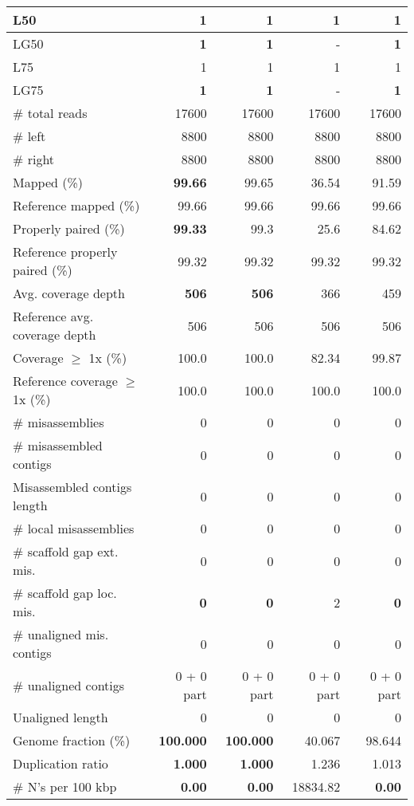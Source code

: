 \documentclass[12pt,a4paper]{article}
\begin{document}
\begin{table}[ht]
\begin{center}
\begin{tabular}{|l*{4}{|r}|}
L50 & 1 & 1 & 1 & 1 \\ \hline
LG50 & {\bf 1} & {\bf 1} & - & {\bf 1} \\ \hline
L75 & 1 & 1 & 1 & 1 \\ \hline
LG75 & {\bf 1} & {\bf 1} & - & {\bf 1} \\ \hline
\# total reads & 17600 & 17600 & 17600 & 17600 \\ \hline
\# left & 8800 & 8800 & 8800 & 8800 \\ \hline
\# right & 8800 & 8800 & 8800 & 8800 \\ \hline
Mapped (\%) & {\bf 99.66} & 99.65 & 36.54 & 91.59 \\ \hline
Reference mapped (\%) & 99.66 & 99.66 & 99.66 & 99.66 \\ \hline
Properly paired (\%) & {\bf 99.33} & 99.3 & 25.6 & 84.62 \\ \hline
Reference properly paired (\%) & 99.32 & 99.32 & 99.32 & 99.32 \\ \hline
Avg. coverage depth & {\bf 506} & {\bf 506} & 366 & 459 \\ \hline
Reference avg. coverage depth & 506 & 506 & 506 & 506 \\ \hline
Coverage $\geq$ 1x (\%) & 100.0 & 100.0 & 82.34 & 99.87 \\ \hline
Reference coverage $\geq$ 1x (\%) & 100.0 & 100.0 & 100.0 & 100.0 \\ \hline
\# misassemblies & 0 & 0 & 0 & 0 \\ \hline
\# misassembled contigs & 0 & 0 & 0 & 0 \\ \hline
Misassembled contigs length & 0 & 0 & 0 & 0 \\ \hline
\# local misassemblies & 0 & 0 & 0 & 0 \\ \hline
\# scaffold gap ext. mis. & 0 & 0 & 0 & 0 \\ \hline
\# scaffold gap loc. mis. & {\bf 0} & {\bf 0} & 2 & {\bf 0} \\ \hline
\# unaligned mis. contigs & 0 & 0 & 0 & 0 \\ \hline
\# unaligned contigs & 0 + 0 part & 0 + 0 part & 0 + 0 part & 0 + 0 part \\ \hline
Unaligned length & 0 & 0 & 0 & 0 \\ \hline
Genome fraction (\%) & {\bf 100.000} & {\bf 100.000} & 40.067 & 98.644 \\ \hline
Duplication ratio & {\bf 1.000} & {\bf 1.000} & 1.236 & 1.013 \\ \hline
\# N's per 100 kbp & {\bf 0.00} & {\bf 0.00} & 18834.82 & {\bf 0.00} \\ \hline

\end{tabular}
\end{center}
\end{table}
\end{document}
